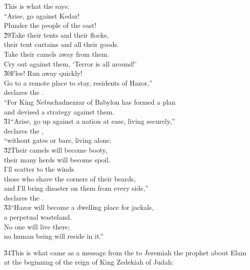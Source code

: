 \begin{poetry}
\poeml This is what the  says: \\
\poeml ``Arise, go against Kedar! \\
\poemll    Plunder the people of the east! \\
\poeml \v{29}Take their tents and their flocks, \\
\poemll    their tent curtains and all their goods. \\
\poeml Take their camels away from them. \\
\poemll    Cry out against them, `Terror is all around!' \\
\poeml \v{30}Flee! Run away quickly! \\
\poemll    Go to a remote place to stay, residents of Hazor,'' \\
\poemlll       declares the . \\
\poeml ``For King Nebuchadnezzar of Babylon has formed a plan \\
\poemll    and devised a strategy against them. \\
\poeml \v{31}``Arise, go up against a nation at ease, living securely,'' \\
\poemll    declares the , \\
\poemlll       ``without gates or bars, living alone. \\
\poeml \v{32}Their camels will become booty, \\
\poemll    their many herds will become spoil. \\
\poeml I'll scatter to the winds \\
\poemll    those who shave the corners of their beards, \\
\poeml and I'll bring disaster on them from every side,'' \\
\poemll    declares the . \\
\poeml \v{33}``Hazor will become a dwelling place for jackals, \\
\poemll    a perpetual wasteland. \\
\poeml No one will live there; \\
\poemll    no human being will reside in it.''
\end{poetry}

\v{34}This is what came as a message from the  to Jeremiah the prophet about Elam at the beginning of the reign of King Zedekiah of Judah:

